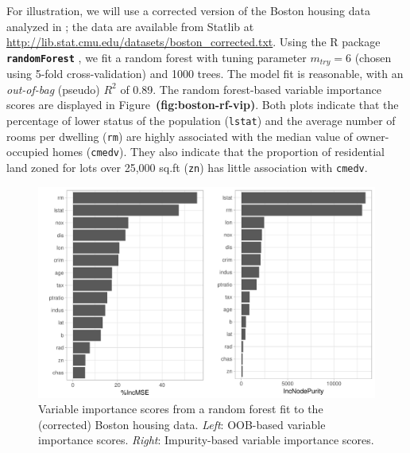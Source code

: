 \documentclass[12pt]{article}
\newcommand{\pkg}[1]{\texorpdfstring%
{{\normalfont\fontseries{b}\selectfont #1}}%
{#1}}
\def\code#1{\texttt{#1}}
\def\pkg#1{\textbf{\texttt{#1}}}
\def\ref#1{\textbf{(#1)}}
\begin{document}
For illustration, we will use a corrected version of the Boston housing data analyzed in \citet{harrison-1978-hedonic}; the data are available from Statlib at \url{http://lib.stat.cmu.edu/datasets/boston_corrected.txt}. Using the R package \pkg{randomForest} \citep{randomForest-pkg}, we fit a random forest with tuning parameter $m_{try} = 6$ (chosen using 5-fold cross-validation) and 1000 trees. The model fit is reasonable, with an \textit{out-of-bag} (pseudo) $R^2$ of 0.89. The random forest-based variable importance scores are displayed in Figure~\ref{fig:boston-rf-vip}. Both plots indicate that the percentage of lower status of the population (\code{lstat}) and the average number of rooms per dwelling (\code{rm}) are highly associated with the median value of owner-occupied homes (\code{cmedv}). They also indicate that the proportion of residential land zoned for lots over 25,000 sq.ft (\code{zn}) has little association with \code{cmedv}.
\begin{figure}[!htb]
  \centering
  \includegraphics[width=1.0\textwidth]{boston-rf-vip}
  \caption{Variable importance scores from a random forest fit to the (corrected) Boston housing data. \textit{Left}: OOB-based variable importance scores. \textit{Right}: Impurity-based variable importance scores. \label{fig:boston-rf-vip}}
\end{figure}
\end{document}
